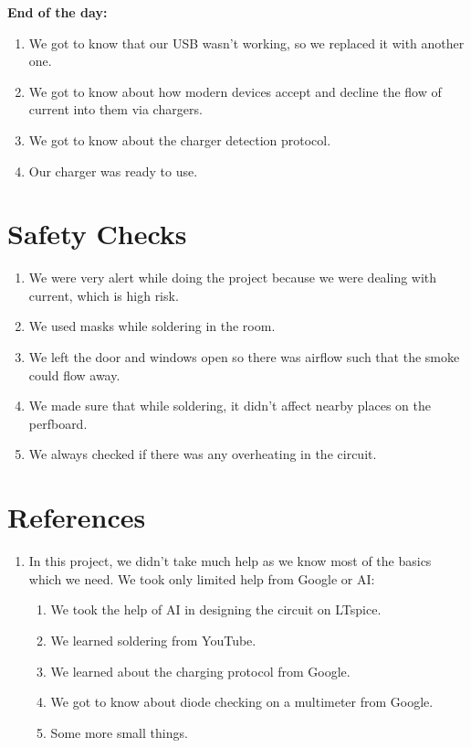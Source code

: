 \documentclass[11pt, a4paper]{article}
\begin{document}
\noindent\textbf{End of the day:}
\begin{enumerate}
    \item We got to know that our USB wasn't working, so we replaced it with another one.
    \item We got to know about how modern devices accept and decline the flow of current into them via chargers.
    \item We got to know about the charger detection protocol.
    \item Our charger was ready to use.
\end{enumerate}

\section{Safety Checks}
\begin{enumerate}
    \item We were very alert while doing the project because we were dealing with current, which is high risk.
    \item We used masks while soldering in the room.
    \item We left the door and windows open so there was airflow such that the smoke could flow away.
    \item We made sure that while soldering, it didn't affect nearby places on the perfboard.
    \item We always checked if there was any overheating in the circuit.  
\end{enumerate}

\section{References}
\begin{enumerate}
    \item In this project, we didn't take much help as we know most of the basics which we need. We took only limited help from Google or AI:
    \begin{enumerate}
        \item We took the help of AI in designing the circuit on LTspice.
        \item We learned soldering from YouTube.
        \item We learned about the charging protocol from Google.
        \item We got to know about diode checking on a multimeter from Google.
        \item Some more small things.
    \end{enumerate}

\end{enumerate}
\end{document}
